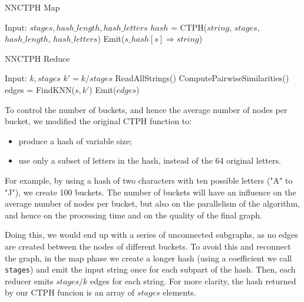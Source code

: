 \documentclass[wcp]{jmlr}
\begin{document}
\begin{algorithm}
\caption{NNCTPH Map}
\label{algo-nnctph-map}
\begin{algorithmic}
\State Input: $stages, hash\_length, hash\_letters$
\State
{}
  \State $hash$ = CTPH($string$, $stages$, $hash\_length$, $hash\_letters$)
    \State Emit($s\_hash[s] \Rightarrow string$)
  \EndFor
\EndProcedure
\end{algorithmic}
\end{algorithm}

\begin{algorithm}
\caption{NNCTPH Reduce}
\label{algo-nnctph-reduce}
\begin{algorithmic}
\State Input: $k, stages$
\State
{}
  \State $k' = k / stages$
  \State ReadAllStrings()
  \State ComputePairwiseSimilarities()
    \State edges = FindKNN($s, k'$)
    \State Emit($edges$)
  \EndFor
\EndProcedure
\end{algorithmic}
\end{algorithm}

To control the number of buckets, and hence the average number of nodes per bucket, we modified the original CTPH function to:

\begin{itemize}
	\item produce a hash of variable size;
	\item use only a subset of letters in the hash, instead of the 64 original letters.
\end{itemize}

For example, by using a hash of two characters with ten possible letters ("A" to "J"), we create 100 buckets. The number of buckets will have an influence on the average number of nodes per bucket, but also on the parallelism of the algorithm, and hence on the processing time and on the quality of the final graph.

Doing this, we would end up with a series of unconnected subgraphs, as no edges are created between the nodes of different buckets. To avoid this and reconnect the graph, in the map phase we create a longer hash (using a coefficient we call \texttt{stages}) and emit the input string once for each subpart of the hash. Then, each reducer emits $stages/k$ edges for each string. For more clarity, the hash returned by our CTPH funcion is an array of $stages$ elements.
\end{document}
